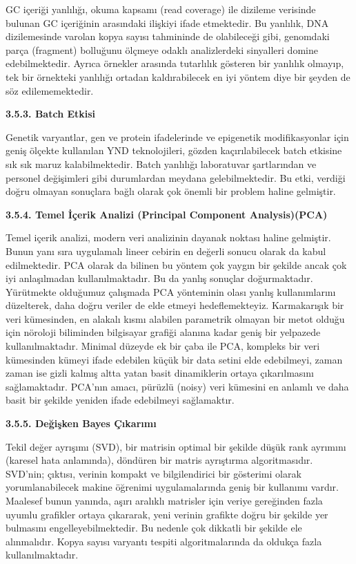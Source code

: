 \documentclass[11pt]{article}
\begin{document}
GC içeriği yanlılığı, okuma kapsamı (read coverage) ile dizileme verisinde bulunan GC içeriğinin arasındaki ilişkiyi ifade etmektedir. Bu yanlılık, DNA dizilemesinde varolan kopya sayısı tahmininde de olabileceği gibi, genomdaki parça (fragment) bolluğunu ölçmeye odaklı analizlerdeki sinyalleri domine edebilmektedir. Ayrıca örnekler arasında tutarlılık gösteren bir yanlılık olmayıp, tek bir örnekteki yanlılığı ortadan kaldırabilecek en iyi yöntem diye bir şeyden de söz edilememektedir.

{\bf 3.5.3. Batch Etkisi}

Genetik varyantlar, gen ve protein ifadelerinde ve epigenetik modifikasyonlar için geniş ölçekte kullanılan  YND teknolojileri, gözden kaçırılabilecek batch etkisine sık sık maruz kalabilmektedir. Batch yanlılığı laboratuvar şartlarından ve personel değişimleri gibi durumlardan meydana gelebilmektedir. Bu etki,  verdiği doğru olmayan sonuçlara bağlı olarak çok önemli bir problem haline gelmiştir.


{\bf 3.5.4. Temel İçerik Analizi (Principal Component Analysis)(PCA)}

Temel içerik analizi, modern veri analizinin dayanak  noktası haline gelmiştir. Bunun yanı sıra uygulamalı lineer cebirin en değerli sonucu olarak da kabul edilmektedir. PCA olarak da bilinen bu yöntem çok yaygın bir şekilde ancak çok iyi anlaşılmadan kullanılmaktadır. Bu da yanlış sonuçlar doğurmaktadır. Yürütmekte olduğumuz çalışmada PCA yönteminin olası yanlış kullanımlarını düzelterek, daha doğru veriler de elde etmeyi hedeflemekteyiz. Karmakarışık bir veri kümesinden, en alakalı kısmı alabilen parametrik olmayan bir metot olduğu için nöroloji biliminden bilgisayar grafiği alanına kadar geniş bir yelpazede kullanılmaktadır. Minimal düzeyde ek bir çaba ile PCA, kompleks bir veri kümesinden kümeyi ifade edebilen küçük bir data setini elde edebilmeyi, zaman zaman ise gizli kalmış altta yatan basit dinamiklerin ortaya çıkarılmasını sağlamaktadır. PCA'nın amacı,  pürüzlü (noisy) veri kümesini en anlamlı ve daha basit bir şekilde yeniden ifade edebilmeyi sağlamaktır.

\clearpage
{\bf 3.5.5. Değişken Bayes Çıkarımı}


Tekil değer ayrışımı (SVD), bir matrisin optimal bir şekilde düşük rank ayrımını (karesel hata anlamında), döndüren bir matris  ayrıştırma algoritmasıdır. SVD'nin; çıktısı, verinin kompakt ve bilgilendirici bir gösterimi olarak yorumlanabilecek makine öğrenimi uygulamalarında geniş bir kullanımı vardır. Maalesef bunun yanında, aşırı aralıklı matrisler için veriye gereğinden fazla uyumlu grafikler ortaya çıkararak, yeni verinin grafikte doğru bir şekilde yer bulmasını engelleyebilmektedir. Bu nedenle çok dikkatli bir şekilde ele alınmalıdır. Kopya sayısı varyantı tespiti algoritmalarında da  oldukça fazla kullanılmaktadır.
\end{document}
